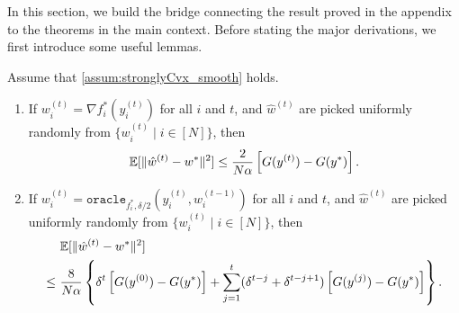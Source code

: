 In this section, we build the bridge connecting the result proved in the appendix to the theorems in the main context. Before stating the major derivations, we first introduce some useful lemmas.
\begin{lemma} \label{lemma:relation_primal_dual}
    Assume that \autoref{assum:stronglyCvx_smooth} holds.  
    \begin{enumerate}
        \item If $w_i^{(t)} = \nabla f_i^*(y_i^{(t)})$ for all $i$ and $t$, and $\hat w^{(t)}$ are picked uniformly randomly from $\{w_i^{(t)}\mid i\in[N]\}$, then
        \begin{align}
            \mathbb{E}[\|\hat w^{(t)} - w^*\|^2] \leq \frac{2}{N \alpha}\left[G(y^{(t)}) - G(y^*) \right].
        \end{align}
        \item If $w_i^{(t)} = \texttt{oracle}_{f_i^*, \delta/2}(y^{(t)}_i, w_{i}^{(t-1)})$ for all $i$ and $t$, and $\hat w^{(t)}$ are picked uniformly randomly from $\{w_i^{(t)}\mid i\in[N]\}$, then
        \begin{align*}
            &\mathbb{E}[\|\hat w^{(t)} - w^*\|^2] \\
            \leq~& \frac{8}{N\alpha} \left\{ \delta^t\left[G(y^{(0)}) - G(y^*)\right] + \sum_{j=1}^t (\delta^{t-j} + \delta^{t-j+1})\left[G(y^{(j)}) - G(y^*)\right]\right\}.
        \end{align*}
    \end{enumerate}
\end{lemma}
